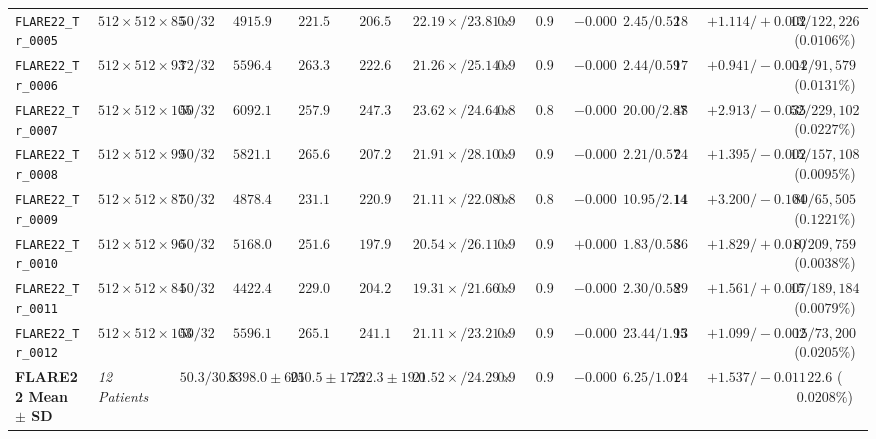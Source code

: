 \documentclass[10pt,twocolumn]{article}
\begin{document}
\begin{table}[t]
{\begin{tabular}{llcccccccccccc}
\texttt{FLARE22\_Tr\_0005} & $512 \times 512 \times 85$ & $50 / 32$ & $4915.9$ & $221.5$ & $206.5$ & $22.19\times / 23.81\times$ & $0.962419$ & $0.962391$ & $-0.000028$ & $2.45 / 0.52$ & $189.61$ & $+1.114 / +0.002$ & $13 / 122,226$ ($0.0106\%$) \\
\texttt{FLARE22\_Tr\_0006} & $512 \times 512 \times 93$ & $72 / 32$ & $5596.4$ & $263.3$ & $222.6$ & $21.26\times / 25.14\times$ & $0.960910$ & $0.960888$ & $-0.000022$ & $2.44 / 0.59$ & $174.83$ & $+0.941 / -0.004$ & $12 / 91,579$ ($0.0131\%$) \\
\texttt{FLARE22\_Tr\_0007} & $512 \times 512 \times 105$ & $50 / 32$ & $6092.1$ & $257.9$ & $247.3$ & $23.62\times / 24.64\times$ & $0.845178$ & $0.845134$ & $-0.000044$ & $20.00 / 2.87$ & $481.72$ & $+2.913 / -0.035$ & $52 / 229,102$ ($0.0227\%$) \\
\texttt{FLARE22\_Tr\_0008} & $512 \times 512 \times 99$ & $50 / 32$ & $5821.1$ & $265.6$ & $207.2$ & $21.91\times / 28.10\times$ & $0.958981$ & $0.958978$ & $-0.000003$ & $2.21 / 0.57$ & $244.87$ & $+1.395 / -0.002$ & $15 / 157,108$ ($0.0095\%$) \\
\texttt{FLARE22\_Tr\_0009} & $512 \times 512 \times 87$ & $50 / 32$ & $4878.4$ & $231.1$ & $220.9$ & $21.11\times / 22.08\times$ & $0.828880$ & $0.828552$ & $-0.000328$ & $10.95 / 2.14$ & $146.54$ & $+3.200 / -0.104$ & $80 / 65,505$ ($0.1221\%$) \\
\texttt{FLARE22\_Tr\_0010} & $512 \times 512 \times 96$ & $50 / 32$ & $5168.0$ & $251.6$ & $197.9$ & $20.54\times / 26.11\times$ & $0.966501$ & $0.966511$ & $+0.000010$ & $1.83 / 0.58$ & $367.51$ & $+1.829 / +0.010$ & $8 / 209,759$ ($0.0038\%$) \\
\texttt{FLARE22\_Tr\_0011} & $512 \times 512 \times 84$ & $50 / 32$ & $4422.4$ & $229.0$ & $204.2$ & $19.31\times / 21.66\times$ & $0.962932$ & $0.962930$ & $-0.000002$ & $2.30 / 0.58$ & $292.36$ & $+1.561 / +0.007$ & $15 / 189,184$ ($0.0079\%$) \\
\texttt{FLARE22\_Tr\_0012} & $512 \times 512 \times 103$ & $50 / 32$ & $5596.1$ & $265.1$ & $241.1$ & $21.11\times / 23.21\times$ & $0.904354$ & $0.904320$ & $-0.000034$ & $23.44 / 1.95$ & $130.75$ & $+1.099 / -0.002$ & $15 / 73,200$ ($0.0205\%$) \\
\textbf{FLARE22 Mean $\pm$ SD} & \textit{12 Patients} & $50.3 / 30.8$ & $5398.0 \pm 601$ & $250.5 \pm 17.5$ & $222.3 \pm 19.0$ & $\mathbf{21.52\times} / \mathbf{24.29\times}$ & $0.936015$ & $\mathbf{0.935974}$ & $-0.000041$ & $\mathbf{6.25 / 1.01}$ & $240.06$ & $\mathbf{+1.537 / -0.011}$ & $\mathbf{22.6}$ ($\mathbf{0.0208\%}$) \\
\bottomrule
\end{tabular}%
}
\end{table}
\end{document}
